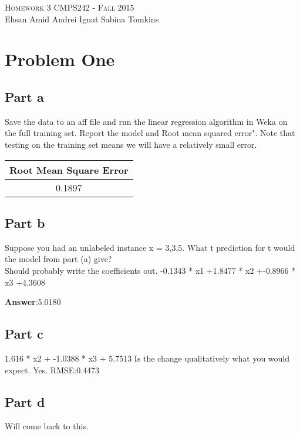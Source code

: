 \documentclass{article}
\begin{document}
\begin{center}
\Huge{\textsc{Homework 3}} 
\Large\textsc{CMPS242 - Fall 2015}\\

\large{Ehsan Amid \hfill Andrei Ignat  \hfill Sabina Tomkins} 
\end{center}

\section{Problem One}
\subsection{Part a}
Save the data to an aff file and run the linear regression algorithm in Weka on the full training set. Report the model and Root mean squared error". Note that testing on the training set means we will have a relatively small error.

\begin{table}[htbp]
    \centering
  
    \begin{tabular}{|c|}
    \hline
        Root Mean Square Error \\ 
            \hline
         0.1897\\
             \hline
      
    \end{tabular}
\end{table}

\subsection{Part b} 
Suppose you had an unlabeled instance x = 3,3,5. What t prediction for t would the model from part (a) give?\\

Should probably write the coefficients out. -0.1343 * x1 +1.8477 * x2 +-0.8966 * x3 +4.3608

\textbf{Answer}:5.0180

\subsection{Part c}
 1.616  * x2 +
     -1.0388 * x3 +
      5.7513
Is the change qualitatively what you would expect. Yes. 
RMSE:0.4473

\subsection{Part d}
Will come back to this. 
\end{document}

